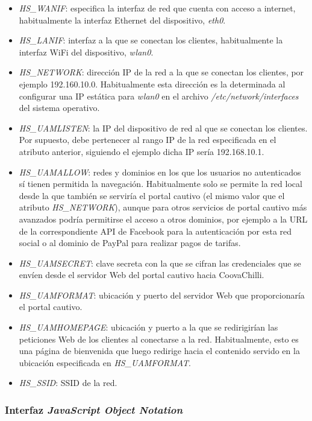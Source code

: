 \begin{itemize}
\item \emph{HS\_WANIF}: especifica la interfaz de red que cuenta con acceso a internet, habitualmente la interfaz Ethernet del dispositivo, \emph{eth0}.
\item \emph{HS\_LANIF}: interfaz a la que se conectan los clientes, habitualmente la interfaz WiFi del dispositivo, \emph{wlan0}.
\item \emph{HS\_NETWORK}: dirección IP de la red a la que se conectan los clientes, por ejemplo 192.160.10.0. Habitualmente esta dirección es la determinada al configurar una IP estática para \emph{wlan0} en el archivo \emph{/etc/network/interfaces} del sistema operativo.
\item \emph{HS\_UAMLISTEN}: la IP del dispositivo de red al que se conectan los clientes. Por supuesto, debe pertenecer al rango IP de la red especificada en el atributo anterior, siguiendo el ejemplo dicha IP sería 192.168.10.1.
\item \emph{HS\_UAMALLOW}: redes y dominios en los que los usuarios no autenticados sí tienen permitida la navegación. Habitualmente solo se permite la red local desde la que también se serviría el portal cautivo (el mismo valor que el atributo \emph{HS\_NETWORK}), aunque para otros servicios de portal cautivo más avanzados podría permitirse el acceso a otros dominios, por ejemplo a la URL de la correspondiente API de Facebook para la autenticación por esta red social o al dominio de PayPal para realizar pagos de tarifas.
\item \emph{HS\_UAMSECRET}: clave secreta con la que se cifran las credenciales que se envíen desde el servidor Web del portal cautivo hacia CoovaChilli.
\item \emph{HS\_UAMFORMAT}: ubicación y puerto del servidor Web que proporcionaría el portal cautivo.
\item \emph{HS\_UAMHOMEPAGE}: ubicación y puerto a la que se redirigirían las peticiones Web de los clientes al conectarse a la red. Habitualmente, esto es una página de bienvenida que luego redirige hacia el contenido servido en la ubicación especificada en \emph{HS\_UAMFORMAT}.
\item \emph{HS\_SSID}: SSID de la red.
\end{itemize}

\subsubsection{Interfaz \emph{JavaScript Object Notation}}

